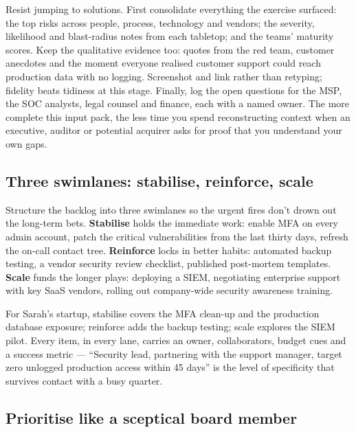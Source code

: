 Resist jumping to solutions. First consolidate everything the exercise surfaced: the top risks across people, process, technology and vendors; the severity, likelihood and blast-radius notes from each tabletop; and the teams' maturity scores. Keep the qualitative evidence too: quotes from the red team, customer anecdotes and the moment everyone realised customer support could reach production data with no logging. Screenshot and link rather than retyping; fidelity beats tidiness at this stage. Finally, log the open questions for the MSP, the SOC analysts, legal counsel and finance, each with a named owner. The more complete this input pack, the less time you spend reconstructing context when an executive, auditor or potential acquirer asks for proof that you understand your own gaps.



\subsection{Three swimlanes: stabilise, reinforce, scale}


Structure the backlog into three swimlanes so the urgent fires don't drown out the long-term bets. \textbf{Stabilise} holds the immediate work: enable MFA on every admin account, patch the critical vulnerabilities from the last thirty days, refresh the on-call contact tree. \textbf{Reinforce} locks in better habits: automated backup testing, a vendor security review checklist, published post-mortem templates. \textbf{Scale} funds the longer plays: deploying a SIEM, negotiating enterprise support with key SaaS vendors, rolling out company-wide security awareness training.


For Sarah's startup, stabilise covers the MFA clean-up and the production database exposure; reinforce adds the backup testing; scale explores the SIEM pilot. Every item, in every lane, carries an owner, collaborators, budget cues and a success metric — ``Security lead, partnering with the support manager, target zero unlogged production access within 45 days'' is the level of specificity that survives contact with a busy quarter.



\subsection{Prioritise like a sceptical board member}


